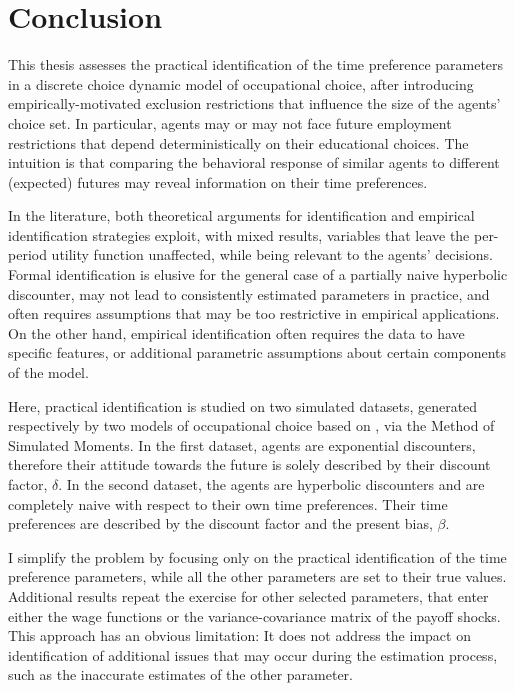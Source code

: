 
\section{Conclusion} \label{conclusion}

This thesis assesses the practical identification of the time preference parameters in a discrete choice dynamic model of occupational choice, after introducing empirically-motivated exclusion restrictions that influence the size of the agents' choice set. In particular, agents may or may not face future employment restrictions that depend deterministically on their educational choices. The intuition is that comparing the behavioral response of similar agents to different (expected) futures may reveal information on their time preferences. 

In the literature, both theoretical arguments for identification and empirical identification strategies exploit, with mixed results, variables that leave the per-period utility function unaffected, while being relevant to the agents' decisions. Formal identification is elusive for the general case of a partially naive hyperbolic discounter, may not lead to consistently estimated parameters in practice, and often requires assumptions that may be too restrictive in empirical applications. On the other hand, empirical identification often requires the data to have specific features, or additional parametric assumptions about certain components of the model.

Here, practical identification is studied on two simulated datasets, generated respectively by two models of occupational choice based on \textcite{KeaneWolpin1994}, via the Method of Simulated Moments. In the first dataset, agents are exponential discounters, therefore their attitude towards the future is solely described by their discount factor, $\delta$. In the second dataset, the agents are hyperbolic discounters and are completely naive with respect to their own time preferences. Their time preferences are described by the discount factor and the present bias, $\beta$.
 
I simplify the problem by focusing only on the practical identification of the time preference parameters, while all the other parameters are set to their true values. Additional results repeat the exercise for other selected parameters, that enter either the wage functions or the variance-covariance matrix of the payoff shocks. This approach has an obvious limitation: It does not address the impact on identification of additional issues that may occur during the estimation process, such as the inaccurate estimates of the other parameter. 

